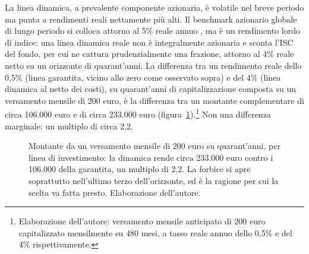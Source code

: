 \medskip
\noindent
La linea dinamica, a prevalente componente azionaria, è volatile
nel breve periodo ma punta a rendimenti reali nettamente più alti. Il
benchmark azionario globale di lungo periodo si colloca attorno al 5\%
reale annuo \cite{DimsonMarshStaunton2025}, ma è un rendimento lordo di
indice: una linea dinamica reale non è integralmente azionaria e sconta
l'ISC del fondo, per cui ne cattura prudenzialmente una frazione, attorno
al 4\% reale netto su un orizzonte di quarant'anni. La differenza tra un
rendimento reale dello 0,5\% (linea garantita, vicino allo zero come
osservato sopra) e del 4\% (linea dinamica al netto dei costi), su
quarant'anni di capitalizzazione composta su un versamento mensile di
200 euro, è la differenza tra un montante complementare di circa
106.000 euro e di circa 233.000 euro (figura~\ref{fig:montante_linee}).\footnote{Elaborazione dell'autore:
versamento mensile anticipato di 200 euro capitalizzato mensilmente su
480 mesi, a tasso reale annuo dello 0,5\% e del 4\% rispettivamente.} Non una
differenza marginale: un multiplo di circa 2,2.

\begin{figure}[h!]
\centering
{}
\caption{Montante da un versamento mensile di 200 euro su quarant'anni, per linea di
investimento: la dinamica rende circa 233.000 euro contro i 106.000 della garantita,
un multiplo di 2,2. La forbice si apre soprattutto nell'ultimo terzo dell'orizzonte,
ed è la ragione per cui la scelta va fatta presto. Elaborazione dell'autore.}
\label{fig:montante_linee}
\end{figure}

